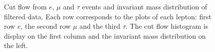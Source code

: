 \documentclass[11 pt]{article}
\begin{document}
\begin{figure}[htbp]
\begin{subfigure}{0.45\textwidth}
    \end{subfigure}
    \hfill
    \begin{subfigure}{0.45\textwidth}
        \centering
    \end{subfigure}
    \caption{\small Cut flow from $e$, $\mu$ and $\tau$ events and invariant mass distribution of filtered data. Each row corresponds to the plots of each lepton: first row $e$, the second row $\mu$ and the third  $\tau$. The cut flow histogram is display on the first column and the invariant mass distribution on the left.}
    \label{fig:selected_events}
\end{figure}
\end{document}
